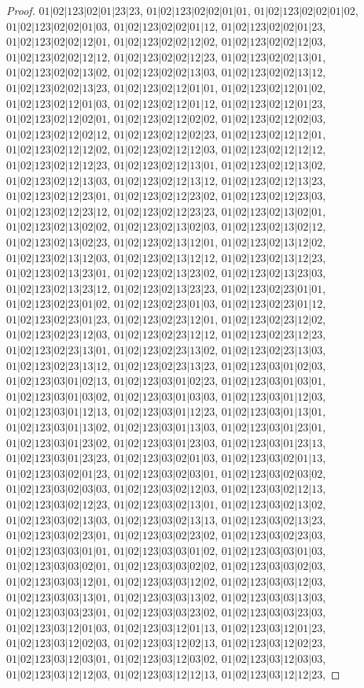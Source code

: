 \documentclass[12pt]{article}
\theoremstyle{plain}
\theoremstyle{definition}
\theoremstyle{remark}
\begin{document}
\begin{proof}
$01|02|123|02|01|23|23$, $01|02|123|02|02|01|01$, $01|02|123|02|02|01|02$, $01|02|123|02|02|01|03$, $01|02|123|02|02|01|12$, $01|02|123|02|02|01|23$, $01|02|123|02|02|12|01$, $01|02|123|02|02|12|02$, $01|02|123|02|02|12|03$, $01|02|123|02|02|12|12$, $01|02|123|02|02|12|23$, $01|02|123|02|02|13|01$, $01|02|123|02|02|13|02$, $01|02|123|02|02|13|03$, $01|02|123|02|02|13|12$, $01|02|123|02|02|13|23$, $01|02|123|02|12|01|01$, $01|02|123|02|12|01|02$, $01|02|123|02|12|01|03$, $01|02|123|02|12|01|12$, $01|02|123|02|12|01|23$, $01|02|123|02|12|02|01$, $01|02|123|02|12|02|02$, $01|02|123|02|12|02|03$, $01|02|123|02|12|02|12$, $01|02|123|02|12|02|23$, $01|02|123|02|12|12|01$, $01|02|123|02|12|12|02$, $01|02|123|02|12|12|03$, $01|02|123|02|12|12|12$, $01|02|123|02|12|12|23$, $01|02|123|02|12|13|01$, $01|02|123|02|12|13|02$, $01|02|123|02|12|13|03$, $01|02|123|02|12|13|12$, $01|02|123|02|12|13|23$, $01|02|123|02|12|23|01$, $01|02|123|02|12|23|02$, $01|02|123|02|12|23|03$, $01|02|123|02|12|23|12$, $01|02|123|02|12|23|23$, $01|02|123|02|13|02|01$, $01|02|123|02|13|02|02$, $01|02|123|02|13|02|03$, $01|02|123|02|13|02|12$, $01|02|123|02|13|02|23$, $01|02|123|02|13|12|01$, $01|02|123|02|13|12|02$, $01|02|123|02|13|12|03$, $01|02|123|02|13|12|12$, $01|02|123|02|13|12|23$, $01|02|123|02|13|23|01$, $01|02|123|02|13|23|02$, $01|02|123|02|13|23|03$, $01|02|123|02|13|23|12$, $01|02|123|02|13|23|23$, $01|02|123|02|23|01|01$, $01|02|123|02|23|01|02$, $01|02|123|02|23|01|03$, $01|02|123|02|23|01|12$, $01|02|123|02|23|01|23$, $01|02|123|02|23|12|01$, $01|02|123|02|23|12|02$, $01|02|123|02|23|12|03$, $01|02|123|02|23|12|12$, $01|02|123|02|23|12|23$, $01|02|123|02|23|13|01$, $01|02|123|02|23|13|02$, $01|02|123|02|23|13|03$, $01|02|123|02|23|13|12$, $01|02|123|02|23|13|23$, $01|02|123|03|01|02|03$, $01|02|123|03|01|02|13$, $01|02|123|03|01|02|23$, $01|02|123|03|01|03|01$, $01|02|123|03|01|03|02$, $01|02|123|03|01|03|03$, $01|02|123|03|01|12|03$, $01|02|123|03|01|12|13$, $01|02|123|03|01|12|23$, $01|02|123|03|01|13|01$, $01|02|123|03|01|13|02$, $01|02|123|03|01|13|03$, $01|02|123|03|01|23|01$, $01|02|123|03|01|23|02$, $01|02|123|03|01|23|03$, $01|02|123|03|01|23|13$, $01|02|123|03|01|23|23$, $01|02|123|03|02|01|03$, $01|02|123|03|02|01|13$, $01|02|123|03|02|01|23$, $01|02|123|03|02|03|01$, $01|02|123|03|02|03|02$, $01|02|123|03|02|03|03$, $01|02|123|03|02|12|03$, $01|02|123|03|02|12|13$, $01|02|123|03|02|12|23$, $01|02|123|03|02|13|01$, $01|02|123|03|02|13|02$, $01|02|123|03|02|13|03$, $01|02|123|03|02|13|13$, $01|02|123|03|02|13|23$, $01|02|123|03|02|23|01$, $01|02|123|03|02|23|02$, $01|02|123|03|02|23|03$, $01|02|123|03|03|01|01$, $01|02|123|03|03|01|02$, $01|02|123|03|03|01|03$, $01|02|123|03|03|02|01$, $01|02|123|03|03|02|02$, $01|02|123|03|03|02|03$, $01|02|123|03|03|12|01$, $01|02|123|03|03|12|02$, $01|02|123|03|03|12|03$, $01|02|123|03|03|13|01$, $01|02|123|03|03|13|02$, $01|02|123|03|03|13|03$, $01|02|123|03|03|23|01$, $01|02|123|03|03|23|02$, $01|02|123|03|03|23|03$, $01|02|123|03|12|01|03$, $01|02|123|03|12|01|13$, $01|02|123|03|12|01|23$, $01|02|123|03|12|02|03$, $01|02|123|03|12|02|13$, $01|02|123|03|12|02|23$, $01|02|123|03|12|03|01$, $01|02|123|03|12|03|02$, $01|02|123|03|12|03|03$, $01|02|123|03|12|12|03$, $01|02|123|03|12|12|13$, $01|02|123|03|12|12|23$, 
\end{proof}
\end{document}
